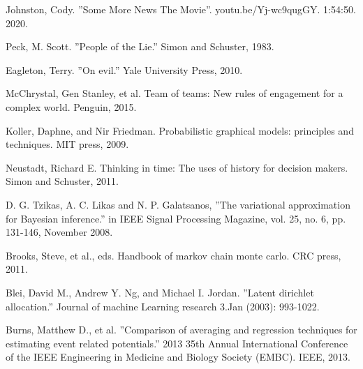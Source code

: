 \documentclass{article}
\begin{document}
\newpage
\begin{thebibliography}{9}

Johnston, Cody. ''Some More News The Movie''. youtu.be/Yj-wc9qugGY. 1:54:50. 2020.

Peck, M. Scott. ''People of the Lie.'' Simon and Schuster, 1983.

Eagleton, Terry. ''On evil.'' Yale University Press, 2010.

McChrystal, Gen Stanley, et al. Team of teams: New rules of engagement for a complex world. Penguin, 2015.

Koller, Daphne, and Nir Friedman. Probabilistic graphical models: principles and techniques. MIT press, 2009.

Neustadt, Richard E. Thinking in time: The uses of history for decision makers. Simon and Schuster, 2011.

D. G. Tzikas, A. C. Likas and N. P. Galatsanos, ''The variational approximation for Bayesian inference.'' in IEEE Signal Processing Magazine, vol. 25, no. 6, pp. 131-146, November 2008.

Brooks, Steve, et al., eds. Handbook of markov chain monte carlo. CRC press, 2011.

Blei, David M., Andrew Y. Ng, and Michael I. Jordan. ''Latent dirichlet allocation.'' Journal of machine Learning research 3.Jan (2003): 993-1022.

Burns, Matthew D., et al. ''Comparison of averaging and regression techniques for estimating event related potentials.'' 2013 35th Annual International Conference of the IEEE Engineering in Medicine and Biology Society (EMBC). IEEE, 2013.

\end{thebibliography}
\end{document}
